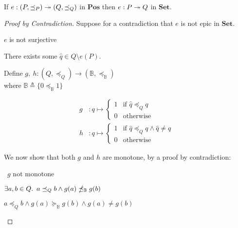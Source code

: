 \begin{lemma}\label{lemma:epic-poset-set}
  If $e : (P, \preceq_P) \twoheadrightarrow (Q, \preceq_Q)$ in $\mathbf{Pos}$ then $e : P \twoheadrightarrow Q$ in $\mathbf{Set}$.

  \begin{proof}[Proof by Contradiction]
    Suppose for a contradiction that $e$ is not epic in $\mathbf{Set}$.

    \begin{itemize}
      \step[\iffs] $e$ is not surjective

      \step[\imps] There exists some $\widehat{q}\in Q\setminus e(P)$.

      \addtolength{\itemsep}{.5\baselineskip}
      \step
        Define $g,~h : (Q, \preceq_Q) \to (\mathbb{B}, \preceq_{\mathbb{B}})$\\
        where $\mathbb{B}\triangleq\{0 \preceq_{\mathbb{B}} 1\}$

        \begin{align*}
          g & : q \mapsto
          \begin{cases}
            1 & \text{if }\widehat{q}\preceq_Q q\\
            0 & \text{otherwise}
          \end{cases}\\
          h & : q \mapsto
          \begin{cases}
            1 & \text{if }\widehat{q}\preceq_Q q\wedge\widehat{q}\neq q\\
            0 & \text{otherwise}
          \end{cases}
        \end{align*}

        We now show that both $g$ and $h$ are monotone, by a proof by contradiction:

      \addtolength{\itemsep}{-.5\baselineskip}
      \step
        \begin{itemize}
          \subp{\star}
            \Ass~$g$ not monotone
            \marginnote{\Hyp}

          \step[\imps]
            $\exists a, b\in Q\ldotp~a\preceq_Qb\wedge g(a)\npreceq_{\mathbb{B}}g(b)$

          \step[\imps]
            $a\preceq_Qb\land g(a)\succeq_{\mathbb{B}}g(b)\land g(a)\neq g(b)$


\end{itemize}
\end{itemize}
\end{proof}
\end{lemma}
